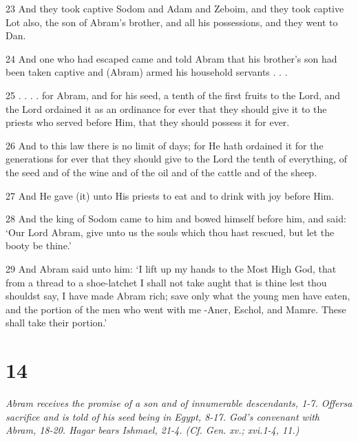 \par 23 And they took captive Sodom and Adam and Zeboim, and they took captive Lot also, the son of Abram's brother, and all his possessions, and they went to Dan.
\par 24 And one who had escaped came and told Abram that his brother's son had been taken captive and (Abram) armed his household servants . . .
\par 25 . . . . for Abram, and for his seed, a tenth of the first fruits to the Lord, and the Lord ordained it as an ordinance for ever that they should give it to the priests who served before Him, that they should possess it for ever.
\par 26 And to this law there is no limit of days; for He hath ordained it for the generations for ever that they should give to the Lord the tenth of everything, of the seed and of the wine and of the oil and of the cattle and of the sheep.
\par 27 And He gave (it) unto His priests to eat and to drink with joy before Him.
\par 28 And the king of Sodom came to him and bowed himself before him, and said: ‘Our Lord Abram, give unto us the souls which thou hast rescued, but let the booty be thine.’
\par 29 And Abram said unto him: ‘I lift up my hands to the Most High God, that from a thread to a shoe-latchet I shall not take aught that is thine lest thou shouldst say, I have made Abram rich; save only what the young men have eaten, and the portion of the men who went with me -Aner, Eschol, and Mamre. These shall take their portion.’

\chapter{14}

\par \textit{Abram receives the promise of a son and of innumerable descendants, 1-7. Offersa sacrifice and is told of his seed being in Egypt, 8-17. God's convenant with Abram, 18-20. Hagar bears Ishmael, 21-4. (Cf. Gen. xv.; xvi.1-4, 11.)}



